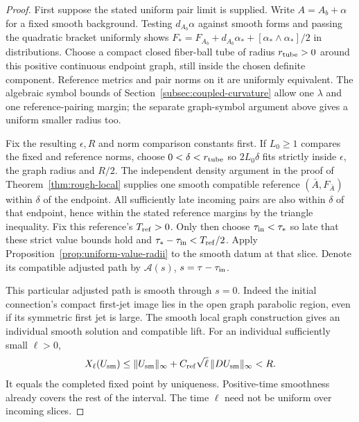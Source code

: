 \documentclass[11pt]{article}
\numberwithin{equation}{section}
\theoremstyle{definition}
\theoremstyle{remark}
\begin{document}
\begin{proof}
First suppose the stated uniform pair limit is supplied.
Write \(A=A_b+\alpha\) for a fixed smooth background.
Testing \(d_{A_b}\alpha\) against smooth forms and
passing the quadratic bracket uniformly shows
\(F_*=F_{A_b}+d_{A_b}\alpha_*+
[\alpha_*\wedge\alpha_*]/2\) in distributions.
Choose a compact closed fiber-ball tube of radius
\(r_{\rm tube}>0\) around this positive continuous
endpoint graph, still inside the
chosen definite component. Reference metrics and pair
norms on it are uniformly equivalent. The algebraic
symbol bounds of Section~\ref{subsec:coupled-curvature}
allow one \(\lambda\) and one reference-pairing margin;
the separate graph-symbol argument above gives a
uniform smaller radius too.

Fix the resulting \(\epsilon,R\) and norm comparison
constants first. If \(L_0\ge1\) compares the fixed and
reference norms, choose \(0<\delta<r_{\rm tube}\) so \(2L_0\delta\)
fits strictly inside \(\epsilon\), the graph radius
and \(R/2\). The independent density argument in the
proof of Theorem~\ref{thm:rough-local} supplies one
smooth compatible reference \((\bar A,F_{\bar A})\)
within \(\delta\) of the endpoint. All sufficiently
late incoming pairs are also within \(\delta\) of
that endpoint, hence within the stated reference
margins by the triangle inequality. Fix this reference's
\(T_{\rm ref}>0\). Only then choose
\(\tau_{\rm in}<\tau_*\) so late that these strict
value bounds hold and
\(\tau_*-\tau_{\rm in}<T_{\rm ref}/2\).
Apply Proposition~\ref{prop:uniform-value-radii} to
the smooth datum at that slice. Denote its compatible
adjusted path by \(\mathcal A(s)\),
\(s=\tau-\tau_{\rm in}\).

This particular adjusted path is smooth through
\(s=0\). Indeed the initial connection's compact
first-jet image lies in the open graph parabolic
region, even if its symmetric first jet is large.
The smooth local graph construction gives an
individual smooth solution and compatible lift.
For an individual sufficiently small \(\ell>0\),
\[
 X_\ell(U_{\rm sm})
 \le\|U_{\rm sm}\|_\infty+
 C_{\rm ref}\sqrt\ell\,\|DU_{\rm sm}\|_\infty<R.
\]
It equals the completed fixed point by uniqueness.
Positive-time smoothness already covers the rest of
the interval. The time \(\ell\) need not be uniform
over incoming slices.


\end{proof}
\end{document}
